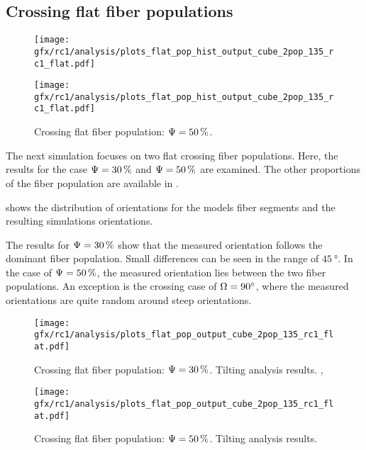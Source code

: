 \subsection{Crossing flat fiber populations}
\label{sec:resCrossFlat}
%
\begin{figure}[!p]
\centering
\texttt{[image: gfx/rc1/analysis/plots\_flat\_pop\_hist\_output\_cube\_2pop\_135\_rc1\_flat.pdf]}
\caption{Crossing flat fiber population: $\modelPsi=\SI{30}{\percent}$.
}
\label{fig:flat_03_fiber_pop_hist}
% 
\vspace{2em}
\texttt{[image: gfx/rc1/analysis/plots\_flat\_pop\_hist\_output\_cube\_2pop\_135\_rc1\_flat.pdf]}
\caption{Crossing flat fiber population: $\textnormal{$\Psi$}=\SI{50}{\percent}$.
}
\label{fig:flat_05_fiber_pop_hist}
\end{figure}
%
The next simulation focuses on two flat crossing fiber populations.
Here, the results for the case $\modelPsi = \SI{30}{\percent}$ and $\textnormal{$\Psi$} = \SI{50}{\percent}$ are examined.
The other proportions of the fiber population are available in .
\par
%
 shows the distribution of orientations for the models fiber segments and the resulting simulations orientations.
\par
% 
The results for $\modelPsi = \SI{30}{\percent}$ show that the measured orientation follows the dominant fiber population.
Small differences can be seen in the range of $\SI{45}{\degree}$.
In the case of $\textnormal{$\Psi$} = \SI{50}{\percent}$, the measured orientation lies between the two fiber populations.
An exception is the crossing case of $\textnormal{$\Omega$}=\SI{90}{\degree}$, where the measured orientations are quite random around steep orientations.
\par
%
\begin{figure}[!p]
\centering
\texttt{[image: gfx/rc1/analysis/plots\_flat\_pop\_output\_cube\_2pop\_135\_rc1\_flat.pdf]}
\caption{Crossing flat fiber population: $\modelPsi=\SI{30}{\percent}$. Tilting analysis results. , }
\label{fig:flat_03_fiber_pop_rofl}
\end{figure}
%
\begin{figure}[!p]
\centering
\texttt{[image: gfx/rc1/analysis/plots\_flat\_pop\_output\_cube\_2pop\_135\_rc1\_flat.pdf]}
\caption{Crossing flat fiber population: $\textnormal{$\Psi$}=\SI{50}{\percent}$. Tilting analysis results.}
\label{fig:flat_05_fiber_pop_rofl}
\end{figure}
